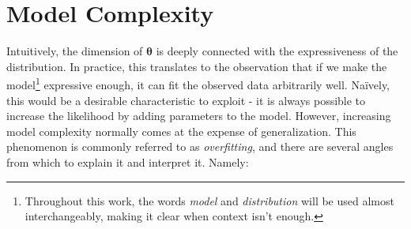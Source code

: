 \section{Model Complexity}
\label{section:modelcomplexity}
Intuitively, the dimension of $\bm{\theta}$ is deeply connected with the expressiveness
of the distribution. In practice, this translates to the observation that if we
make the model\footnote{Throughout this work, the words \emph{model}
and \emph{distribution} will be used almost interchangeably, making it clear when context isn't
enough.} expressive enough, it can fit the observed data arbitrarily well. Naïvely,
this would be a desirable characteristic to exploit - it is always possible to increase
the likelihood by adding parameters to the model. However, increasing model
complexity normally comes at the expense of generalization. This phenomenon is
commonly referred to as \emph{overfitting}, and there are several
angles from which to explain it and interpret it. Namely:
